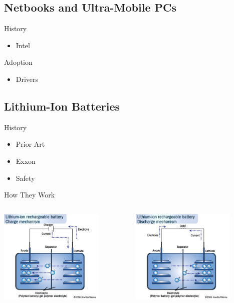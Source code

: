 \documentclass{beamer}
\begin{document}
\subsection{Netbooks and Ultra-Mobile PCs}

\begin{frame}{History}
  \begin{itemize}
  \item Intel %
  \end{itemize}
\end{frame}

\begin{frame}{Adoption}
  \begin{itemize}
  \item Drivers
  \end{itemize}
\end{frame}

\subsection{Lithium-Ion Batteries}

\begin{frame}{History}
  \begin{itemize}
  \item Prior Art
  \item Exxon %
  \item Safety
  \end{itemize}
\end{frame}

\begin{frame}{How They Work}
  \begin{columns}
    \begin{column}{5cm}
      \includegraphics[width=5cm]{lionCharge.jpg}
    \end{column}
    \begin{column}{5cm}
      \includegraphics[width=5cm]{lionDischarge.jpg}
    \end{column}
  \end{columns}
\end{frame}
\end{document}
